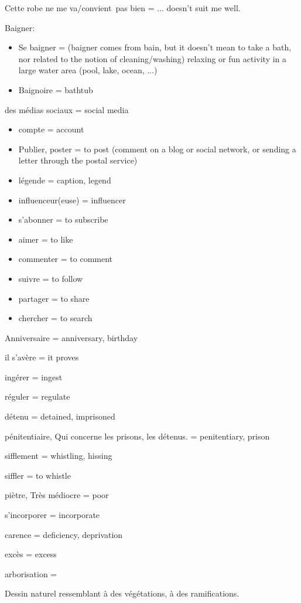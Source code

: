 Cette robe ne me va/convient~pas bien = ... doesn't suit me well.

Baigner:

\begin{itemize}
\item
  Se baigner = (baigner comes from bain, but it doesn't mean to take a
  bath, nor related to the notion of cleaning/washing) relaxing or fun
  activity in a large water area (pool, lake, ocean, ...)
\item
  Baignoire = bathtub~
\end{itemize}

des médias sociaux = social media

\begin{itemize}
\item
  compte = account
\item
  {Publier, poster = to post (comment on a blog or social network, or
  sending a letter through the postal service)}
\item
  {légende = caption, legend}
\item
  {influenceur(euse) = influencer}
\item
  {s'abonner = to subscribe}
\item
  {aimer = to like}
\item
  {commenter = to comment}
\item
  {suivre = to follow}
\item
  {partager = to share}
\item
  {chercher = to search}
\end{itemize}

Anniversaire = anniversary, birthday

{il s'avère = it proves}

{ingérer = ingest}

{réguler = regulate}

{détenu = detained, imprisoned}

{pénitentiaire, Qui concerne les prisons, les détenus. = penitentiary,
prison}

{sifflement = whistling, hissing}

{siffler = to whistle}

{piètre, Très médiocre = poor}

{s'incorporer = incorporate}

{carence = deficiency, deprivation}

{excès = excess}

{arborisation =}

{Dessin naturel ressemblant à des végétations, à des ramifications.}

